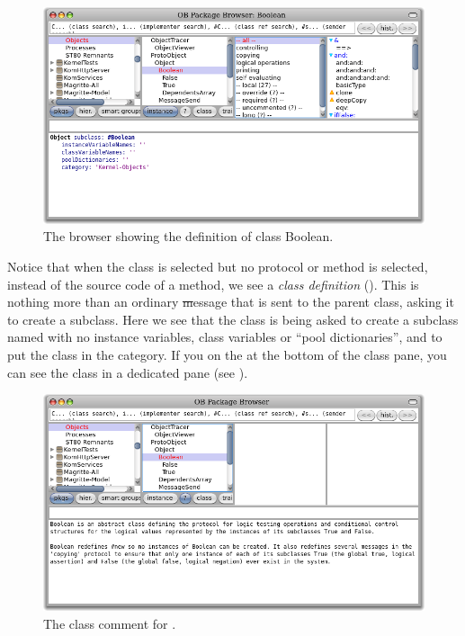 \documentclass[a4paper,10pt,twoside]{book}
\begin{document}

\begin{figure}[hbt]
\centerline {\includegraphics[width=\textwidth]{Kernel-objects-boolean}}
\caption{The browser showing the definition of class Boolean.
\label{fig:browseBoolean}}
\end{figure}

Notice that when the  class is selected but no protocol or method is selected, instead of the source code of a method, we see a \emph{class definition} ().
This is nothing more than an ordinary \st message that is sent to the parent class, asking it to create a subclass.
Here we see that the class  is being asked to create a subclass named  with no instance variables, class variables or ``pool dictionaries'', and to put the class  in the  category.
If you \click on the  at the bottom of the class pane, you can see the class  in a dedicated pane (see ).

\begin{figure}[hbt]
\centerline {\includegraphics[width=\textwidth]{classComment}}
\caption{The class comment for .
\label{fig:classComment}}
\end{figure}
\end{document}
